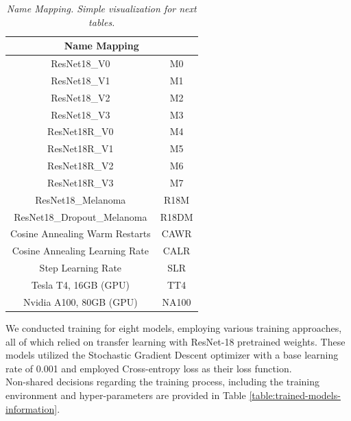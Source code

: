 \begin{table}[H]
  \centering
  \begin{tabular}{cc}
    \toprule

    \multicolumn{2}{c}{\textbf{Name Mapping}} \\
    \midrule
    ResNet18\_V0 & M0 \\
    ResNet18\_V1 & M1 \\
    ResNet18\_V2 & M2 \\
    ResNet18\_V3 & M3 \\
    ResNet18R\_V0  & M4 \\
    ResNet18R\_V1  & M5 \\
    ResNet18R\_V2 & M6 \\
    ResNet18R\_V3  & M7 \\
    ResNet18\_Melanoma & R18M \\
    ResNet18\_Dropout\_Melanoma & R18DM \\
    Cosine Annealing Warm Restarts & CAWR \\
    Cosine Annealing Learning Rate & CALR \\
    Step Learning Rate & SLR \\
    Tesla T4, 16GB (GPU) & TT4 \\
    Nvidia A100, 80GB (GPU) & NA100 \\
    \bottomrule
  \end{tabular}
  \caption[Name Mapping]
  {\textit{Name Mapping. Simple visualization for next tables.
  }}
  {\label{table:mapping-names}}
\end{table}

We conducted training for eight models, employing various training approaches,
all of which relied on transfer learning with ResNet-18 pretrained weights.
These models utilized the Stochastic Gradient Descent optimizer with a base
learning rate of 0.001 and employed Cross-entropy loss as their loss function. \\

Non-shared decisions regarding the training process, including the
training environment and hyper-parameters are provided in
Table \ref{table:trained-models-information}.

\newpage

